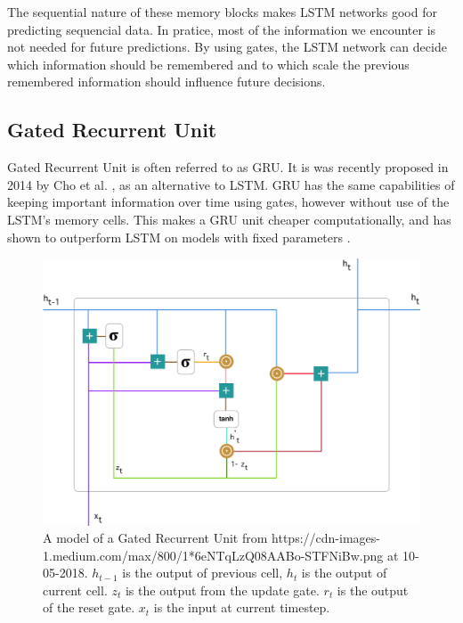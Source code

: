 The sequential nature of these memory blocks makes LSTM networks good for predicting sequencial data. In pratice, most of the information we encounter is not needed for future predictions. By using gates, the LSTM network can decide which information should be remembered and to which scale the previous remembered information should influence future decisions. \cite{gers_learning_1999}\cite{_understanding_2015}


\subsection{Gated Recurrent Unit}

Gated Recurrent Unit is often referred to as GRU. It is was recently proposed in 2014 by Cho et al. \cite{cho_learning_2014}, as an alternative to LSTM. GRU has the same capabilities of keeping important information over time using gates, however without use of the LSTM's memory cells. This makes a GRU unit cheaper computationally, and has shown to outperform LSTM on models with fixed parameters \cite{chung_empirical_2014}. 

\begin{figure}[H]
    \centering
    \includegraphics[width=\textwidth]{Assets/Chapter2_Theory/GRU-cell.png}
    \caption{A model of a Gated Recurrent Unit from https://cdn-images-1.medium.com/max/800/1*6eNTqLzQ08AABo-STFNiBw.png at 10-05-2018. $h_{t-1}$ is the output of previous cell, $h_t$ is the output of current cell. $z_t$ is the output from the update gate. $r_t$ is the output of the reset gate. $x_t$ is the input at current timestep. \cite{kostadinov_understanding_2017}}
    \label{fig:gru-single-cell}
\end{figure}

